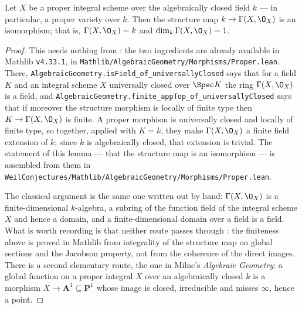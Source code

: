 \begin{lemma}
\label{lem:cube-global-sections}
\leanok
Let $X$ be a proper integral scheme over the algebraically closed field $k$
--- in particular, a proper variety over $k$.  Then the structure map
$k\to\Gamma(X,\O_X)$ is an isomorphism; that is, $\Gamma(X,\O_X)=k$ and
$\dim_k\Gamma(X,\O_X)=1$.
\end{lemma}
\begin{proof}
\leanok
This needs nothing from : the two ingredients are
already available in Mathlib \texttt{v4.33.1}, in
\texttt{Mathlib/AlgebraicGeometry/Morphisms/Proper.lean}.  There,
\texttt{AlgebraicGeometry.isField\_of\_universallyClosed} says that for a
field $K$ and an integral scheme $X$ universally closed over $\Spec K$ the
ring $\Gamma(X,\O_X)$ is a field, and
\texttt{AlgebraicGeometry.finite\_appTop\_of\_universallyClosed} says that if
moreover the structure morphism is locally of finite type then
$K\to\Gamma(X,\O_X)$ is finite.  A proper morphism is universally closed and
locally of finite type, so together, applied with $K=k$, they make
$\Gamma(X,\O_X)$ a finite field extension of $k$; since $k$ is algebraically
closed, that extension is trivial.  The statement of this lemma --- that the
structure map is an isomorphism --- is assembled from them in
\texttt{WeilConjectures/Mathlib/AlgebraicGeometry/Morphisms/Proper.lean}.

The classical argument is the same one written out by hand: $\Gamma(X,\O_X)$
is a finite-dimensional $k$-algebra, a subring of the function field of the
integral scheme $X$ and hence a domain, and a finite-dimensional domain over a
field is a field.  What is worth recording is that neither route passes
through : the finiteness above is proved
in Mathlib from integrality of the structure map on global sections and the
Jacobson property, not from the coherence of the direct images.  There is a
second elementary route, the one in Milne's \emph{Algebraic Geometry}: a
global function on a proper integral $X$ over an algebraically closed $k$ is a
morphism $X\to\mathbf A^1\subseteq\mathbf P^1$ whose image is closed,
irreducible and misses $\infty$, hence a point.
\end{proof}


